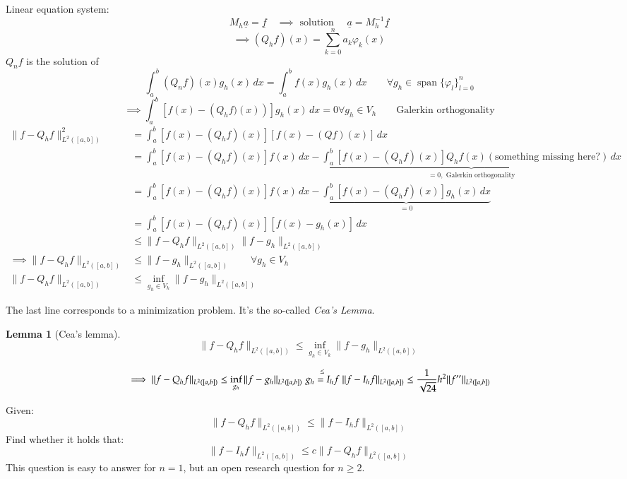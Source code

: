 \documentclass{article}
\newtheorem*{lemma}{Lemma}
\begin{document}
Linear equation system:
\[ M_h \underline{a} = \underline{f} \quad \implies \text{ solution } \quad \underline{a} = M_h^{-1} \underline{f} \]
\[ \implies (Q_h f)(x) = \sum_{k=0}^n a_k \varphi_k(x) \]
$Q_n f$ is the solution of
\[ \int_a^b \left(Q_n f\right)(x) g_h(x) \, dx = \int_a^b f(x) g_h(x) \, dx \qquad \forall g_h \in \operatorname{span}\{\varphi_l\}^n_{l=0} \]
\[ \implies \int_a^b \left[f(x) - \left(Q_h f)(x)\right)\right] g_h(x) \, dx = 0 \forall g_h \in V_h \qquad \text{Galerkin orthogonality} \]
\begin{align*}
  \| f - Q_h f \|^2_{L^2([a,b])}
    &= \int_a^b \left[ f(x) - (Q_h f)(x) \right] \left[ f(x) - (Q f)(x) \right] \, dx \\
    &= \int_a^b \left[ f(x) - (Q_h f)(x) \right] f(x) \, dx - \underbrace{\int_a^b \left[f(x) - (Q_h f)(x)\right] Q_h f(x) (\text{something missing here?}) \, dx}_{=0, \text{ Galerkin orthogonality}} \\ %
    &= \int_a^b \left[f(x) - (Q_h f)(x)\right] f(x) \, dx - \underbrace{\int_a^b \left[f(x) - (Q_h f)(x)\right] g_h(x) \, dx}_{=0} \\
    &= \int_a^b \left[f(x) - (Q_h f)(x)\right] \left[f(x) - g_h(x)\right] \, dx \\
    &\leq \| f - Q_h f \|_{L^2([a,b])} \| f - g_h \|_{L^2([a,b])} \\
  \implies \| f - Q_h f \|_{L^2([a,b])} &\leq \|f - g_h\|_{L^2([a,b])} \qquad \forall g_h \in V_h \\
  \| f - Q_h f \|_{L^2([a,b])} &\leq \inf_{g_h \in V_k} \| f - g_h \|_{L^2([a,b])}
\end{align*}

The last line corresponds to a minimization problem.
It's the so-called \emph{Cea's Lemma}.

\begin{lemma}[Cea's lemma]
  \[ \| f - Q_h f \|_{L^2([a,b])} \leq \inf_{g_h \in V_k} \| f - g_h \|_{L^2([a,b])} \]
\end{lemma}

\[
  \implies \|f - Q_h f \|_{L^2([a,b])} \leq \inf_{g_h} \| f - g_h \|_{L^2([a,b])} \\
    \stackrel{\leq}{g_h = I_h f} \|f - I_h f \|_{L^2([a,b])}
    \leq \frac{1}{\sqrt{24}} h^2 \| f'' \|_{L^2([a,b])}
\]

Given:
\[ \| f - Q_h f \|_{L^2([a,b])} \leq \| f - I_h f \|_{L^2([a,b])} \]
Find whether it holds that:
\[ \| f - I_h f \|_{L^2([a,b])} \leq c \|f - Q_h f \|_{L^2([a,b])} \]
This question is easy to answer for $n=1$, but an open research question for $n\geq 2$.
\end{document}
